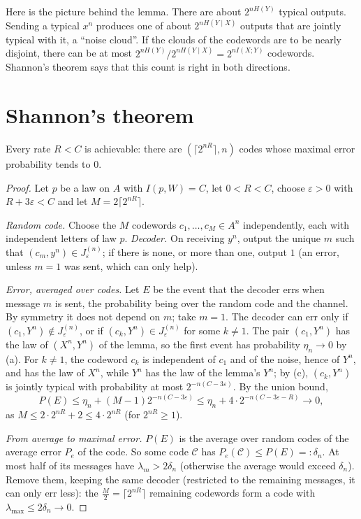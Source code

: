 Here is the picture behind the lemma. There are about $2^{nH(Y)}$ typical outputs. Sending a typical $x^n$ produces one of about $2^{nH(Y\mid X)}$ outputs that are jointly typical with it, a ``noise cloud''. If the clouds of the codewords are to be nearly disjoint, there can be at most $2^{nH(Y)}/2^{nH(Y\mid X)}=2^{nI(X;Y)}$ codewords. Shannon's theorem says that this count is right in both directions.

\section{Shannon's theorem}\label{sec:shannon}

\begin{theorem}\label{thm:shannon}
Every rate $R<C$ is achievable: there are $(\lceil2^{nR}\rceil,n)$ codes whose maximal error probability tends to $0$.
\end{theorem}

\begin{proof}
Let $p$ be a law on $A$ with $I(p,W)=C$, let $0<R<C$, choose $\varepsilon>0$ with $R+3\varepsilon<C$ and let $M=2\lceil2^{nR}\rceil$.

\emph{Random code.} Choose the $M$ codewords $c_1,\dots,c_M\in A^n$ independently, each with independent letters of law $p$. \emph{Decoder.} On receiving $y^n$, output the unique $m$ such that $(c_m,y^n)\in J_\varepsilon^{(n)}$; if there is none, or more than one, output $1$ (an error, unless $m=1$ was sent, which can only help).

\emph{Error, averaged over codes.} Let $E$ be the event that the decoder errs when message $m$ is sent, the probability being over the random code and the channel. By symmetry it does not depend on $m$; take $m=1$. The decoder can err only if $(c_1,Y^n)\notin J_\varepsilon^{(n)}$, or if $(c_k,Y^n)\in J_\varepsilon^{(n)}$ for some $k\ne1$. The pair $(c_1,Y^n)$ has the law of $(X^n,Y^n)$ of the lemma, so the first event has probability $\eta_n\to0$ by (a). For $k\ne1$, the codeword $c_k$ is independent of $c_1$ and of the noise, hence of $Y^n$, and has the law of $X^n$, while $Y^n$ has the law of the lemma's $Y^n$; by (c), $(c_k,Y^n)$ is jointly typical with probability at most $2^{-n(C-3\varepsilon)}$. By the union bound,
\[
P(E)\le\eta_n+(M-1)2^{-n(C-3\varepsilon)}\le\eta_n+4\cdot2^{-n(C-3\varepsilon-R)}\longrightarrow0,
\]
as $M\le2\cdot2^{nR}+2\le4\cdot2^{nR}$ (for $2^{nR}\ge1$).

\emph{From average to maximal error.} $P(E)$ is the average over random codes of the average error $P_e$ of the code. So some code $\mathcal C$ has $P_e(\mathcal C)\le P(E)=:\delta_n$. At most half of its messages have $\lambda_m>2\delta_n$ (otherwise the average would exceed $\delta_n$). Remove them, keeping the same decoder (restricted to the remaining messages, it can only err less): the $\frac M2=\lceil2^{nR}\rceil$ remaining codewords form a code with $\lambda_{\max}\le2\delta_n\to0$.
\end{proof}

